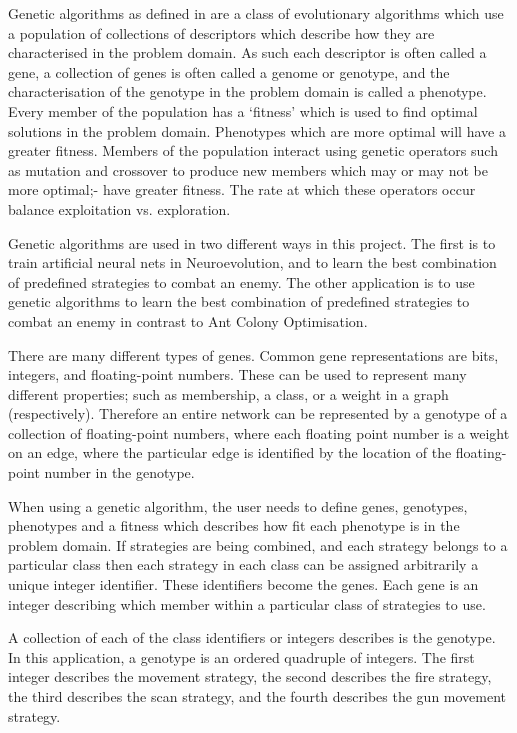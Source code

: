 Genetic algorithms as defined in \cite{ga} are a class of evolutionary algorithms which use a population of collections of descriptors which describe how they are characterised in the problem domain. As such each descriptor is often called a gene, a collection of genes is often called a genome or genotype, and the characterisation of the genotype in the problem domain is called a phenotype. Every member of the population has a `fitness' which is used to find optimal solutions in the problem domain. Phenotypes which are more optimal will have a greater fitness. Members of the population interact using genetic operators such as mutation and crossover to produce new members which may or may not be more optimal;- have greater fitness. The rate at which these operators occur balance exploitation vs. exploration.

Genetic algorithms are used in two different ways in this project. The first is to train artificial neural nets in Neuroevolution, and to learn the best combination of predefined strategies to combat an enemy. The other application is to use genetic algorithms to learn the best combination of predefined strategies to combat an enemy in contrast to Ant Colony Optimisation.

There are many different types of genes. Common gene representations are bits, integers, and floating-point numbers. These can be used to represent many different properties; such as membership, a class, or a weight in a graph (respectively). Therefore an entire network can be represented by a genotype of a collection of floating-point numbers, where each floating point number is a weight on an edge, where the particular edge is identified by the location of the floating-point number in the genotype.


When using a genetic algorithm, the user needs to define genes, genotypes, phenotypes and a fitness which describes how fit each phenotype is in the problem domain. If strategies are being combined, and each strategy belongs to a particular class then each strategy in each class can be assigned arbitrarily a unique integer identifier. These identifiers become the genes. Each gene is an integer describing which member within a particular class of strategies to use.

A collection of each of the class identifiers or integers describes is the genotype. In this application, a genotype is an ordered quadruple of integers. The first integer describes the movement strategy, the second describes the fire strategy, the third describes the scan strategy, and the fourth describes the gun movement strategy.

